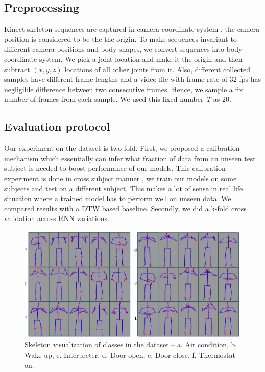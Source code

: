 \documentclass[10pt,twocolumn,letterpaper]{article}
\begin{document}
\subsection{Preprocessing}
Kinect skeleton sequences are 
captured in camera coordinate system \ie, the 
camera position is considered to be the
the origin. To make sequences invariant to different 
camera positions and body-shapes, we convert sequences 
into body coordinate system. We pick a joint location 
and make it the 
origin and then  subtract $(x, y, z)$ locations of all
other joints from it. Also, different collected samples have
different frame lengths and a video file with frame rate of 32 fps has negligible difference between two consecutive frames. Hence, we sample 
a fix number of frames from each sample. We used this fixed number \textit{T} as  20. 



\subsection{Evaluation protocol}
\label{sec:ev_prot}
Our experiment on the dataset is two fold. First, we proposed a calibration mechanism which essentially can infer what fraction of data from an unseen test subject is needed to boost performance of our models. This calibration experiment is done in cross subject manner \eg, we train our models on some subjects and test on a different subject. This makes a lot of sense in real life situation where a trained model has to perform well on unseen data. We compared results with a DTW based baseline. Secondly, we did a k-fold cross validation across RNN variations.



\begin{figure}
	\begin{center}
		\includegraphics[width=.8\linewidth]{sk_data_viz}
	\end{center}
	\caption{Skeleton visualization of classes in the dataset -- a. Air condition, b. Wake up, c. Interpreter, d. Door open, e. Door close, f. Thermostat on.}
	\label{fig:sk_dat_viz}
\end{figure}
\end{document}
